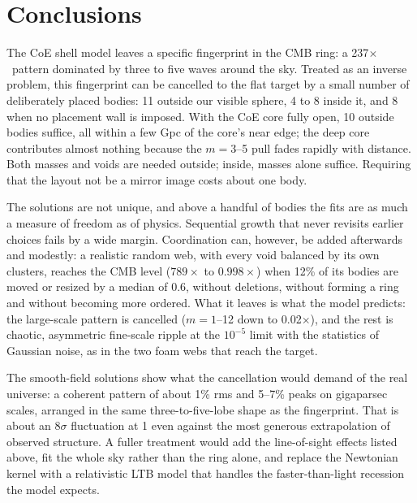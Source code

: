 \documentclass[aps,prd,twocolumn,nofootinbib,superscriptaddress,floatfix]{revtex4-2}
\newcommand{\fl}{\ensuremath{\times}}
\begin{document}
\section{Conclusions}
The CoE shell model leaves a specific fingerprint in the CMB ring: a 237\fl\ pattern dominated by three to five waves around the sky. Treated as an inverse problem, this fingerprint can be cancelled to the flat target by a small number of deliberately placed bodies: 11 outside our visible sphere, 4 to 8 inside it, and 8 when no placement wall is imposed. With the CoE core fully open, 10 outside bodies suffice, all within a few Gpc of the core's near edge; the deep core contributes almost nothing because the $m=3$--5 pull fades rapidly with distance. Both masses and voids are needed outside; inside, masses alone suffice. Requiring that the layout not be a mirror image costs about one body.

The solutions are not unique, and above a handful of bodies the fits are as much a measure of freedom as of physics. Sequential growth that never revisits earlier choices fails by a wide margin. Coordination can, however, be added afterwards and modestly: a realistic random web, with every void balanced by its own clusters, reaches the CMB level ($789\times$ to $0.998\times$) when 12\% of its bodies are moved or resized by a median of \SI{0.6}{\Gpc}, without deletions, without forming a ring and without becoming more ordered. What it leaves is what the model predicts: the large-scale pattern is cancelled ($m=1$--12 down to 0.02\fl), and the rest is chaotic, asymmetric fine-scale ripple at the $10^{-5}$ limit with the statistics of Gaussian noise, as in the two foam webs that reach the target.

The smooth-field solutions show what the cancellation would demand of the real universe: a coherent pattern of about 1\% rms and 5--7\% peaks on gigaparsec scales, arranged in the same three-to-five-lobe shape as the fingerprint. That is about an $8\sigma$ fluctuation at \SI{1}{\Gpc} even against the most generous extrapolation of observed structure. A fuller treatment would add the line-of-sight effects listed above, fit the whole sky rather than the ring alone, and replace the Newtonian kernel with a relativistic LTB model that handles the faster-than-light recession the model expects.


\clearpage

\end{document}
